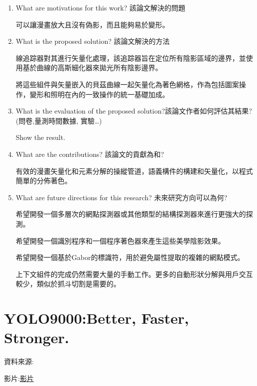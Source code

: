 \begin{enumerate}
\item  What are motivations for this work? 該論文解決的問題  

可以讓漫畫放大且沒有偽影，而且能夠易於變形。


\item  What is the proposed solution? 該論文解決的方法

線追踪器對其進行矢量化處理，該追踪器旨在定位所有陰影區域的邊界，並使用基於曲線的高斯細化器來拋光所有陰影邊界。

將這些組件與矢量嵌入的貝茲曲線一起矢量化為著色網格，作為包括圖案操作，變形和照明在內的一致操作的統一基礎加成。

\item  What is the evaluation of the proposed solution?該論文作者如何評估其結果? (問卷,量測時間數據, 實驗…)

Show the result.

\item  What are the contributions? 該論文的貢獻為和?

有效的漫畫矢量化和元素分解的操縱管道，語義構件的構建和矢量化，以程式簡單的分佈著色。


\item  What are future directions for this research? 未來研究方向可以為何?

希望開發一個多層次的網點探測器或其他類型的結構探測器來進行更強大的探測。

希望開發一個識別程序和一個程序著色器來產生這些美學陰影效果。

希望開發一個基於Gabor的標識符，用於避免屬性提取的複雜的網點模式。

上下文組件的完成仍然需要大量的手動工作。更多的自動形狀分解與用戶交互較少，類似於抓斗切割是需要的。


\end{enumerate}


\section{YOLO9000:Better, Faster, Stronger.}
資料來源:\cite{RedmonF17}\par
影片:\href{YOLO 9000 Better Faster Stronger.mp4}{影片}
       
